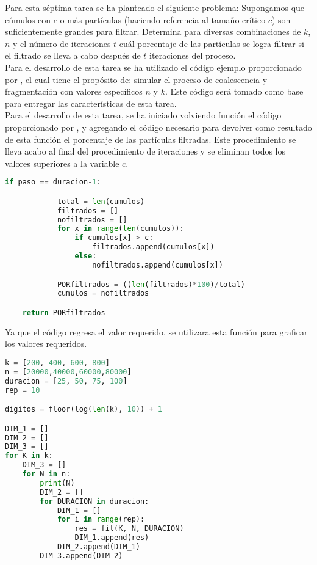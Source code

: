 \documentclass{article}
\begin{document}
Para esta séptima tarea se ha planteado el siguiente problema: Supongamos que cúmulos con $c$ o más partículas (haciendo referencia al tamaño crítico $c$) son suficientemente grandes para filtrar. Determina para diversas combinaciones de $k$, $n$ y el número de iteraciones $t$ cuál porcentaje de las partículas se logra filtrar si el filtrado se lleva a cabo después de $t$ iteraciones del proceso.\\

Para el desarrollo de esta tarea se ha utilizado el código ejemplo proporcionado por \citet{DRA.Code}, el cual tiene el propósito de: 
simular el proceso de coalescencia y fragmentación con valores específicos $n$ y $k$. Este código será tomado como base para entregar las características de esta tarea.\\

Para el desarrollo de esta tarea, se ha iniciado volviendo función el código proporcionado por \citet{DRA.Code}, y agregando el código necesario para devolver como resultado de esta función el porcentaje de las partículas filtradas. Este procedimiento se lleva acabo al final del procedimiento de iteraciones y se eliminan todos los valores superiores a la variable $c$.\\

\begin{lstlisting}[language=Python]
if paso == duracion-1:

            total = len(cumulos)
            filtrados = []
            nofiltrados = []
            for x in range(len(cumulos)):
                if cumulos[x] > c:
                    filtrados.append(cumulos[x])
                else:
                    nofiltrados.append(cumulos[x])

            PORfiltrados = ((len(filtrados)*100)/total)
            cumulos = nofiltrados

    return PORfiltrados 
\end{lstlisting}

Ya que el código regresa el valor requerido, se utilizara esta función para graficar los valores requeridos.

\begin{lstlisting}[language=Python]
k = [200, 400, 600, 800]
n = [20000,40000,60000,80000]
duracion = [25, 50, 75, 100]
rep = 10

digitos = floor(log(len(k), 10)) + 1

DIM_1 = []
DIM_2 = []
DIM_3 = []
for K in k:
    DIM_3 = []
    for N in n:
        print(N)
        DIM_2 = []
        for DURACION in duracion:
            DIM_1 = []
            for i in range(rep):
                res = fil(K, N, DURACION)
                DIM_1.append(res)
            DIM_2.append(DIM_1)
        DIM_3.append(DIM_2)
\end{lstlisting}
\end{document}

